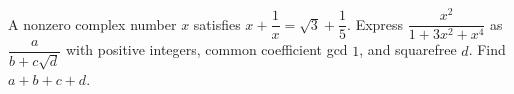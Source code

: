A nonzero complex number $x$ satisfies $x+\dfrac{1}{x}=\sqrt3+\dfrac{1}{5}$. Express $\dfrac{x^2}{1+3x^2+x^4}$ as $\dfrac{a}{b+c\sqrt d}$ with positive integers, common coefficient gcd $1$, and squarefree $d$. Find $a+b+c+d$.
